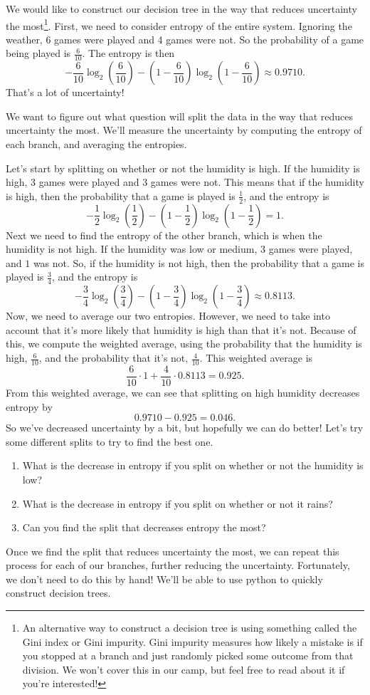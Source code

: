 \documentclass[10pt]{article}
\begin{document}
We would like to construct our decision tree in the way that reduces uncertainty the most\footnote{An alternative way to construct a decision tree is using something called the Gini index or Gini impurity. Gini impurity measures how likely a mistake is if you stopped at a branch and just randomly picked some outcome from that division. We won't cover this in our camp, but feel free to read about it if you're interested!}. First, we need to consider entropy of the entire system. Ignoring the weather, 6 games were played and 4 games were not. So the probability of a game being played is $\frac{6}{10}$. The entropy is then
\[
-\frac{6}{10}\log_2\left(\frac{6}{10}\right) - \left(1-\frac{6}{10}\right)\log_2\left(1-\frac{6}{10}\right)\approx 0.9710.
\]
That's a lot of uncertainty!

We want to figure out what question will split the data in the way that reduces uncertainty the most. We'll measure the uncertainty by computing the entropy of each branch, and averaging the entropies.

Let's start by splitting on whether or not the humidity is high. If the humidity is high, 3 games were played and 3 games were not. This means that if the humidity is high, then the probability that a game is played is $\frac{1}{2}$, and the entropy is
\[
-\frac{1}{2}\log_2\left(\frac{1}{2}\right) - \left(1-\frac{1}{2}\right)\log_2\left(1-\frac{1}{2}\right)=1.
\]
Next we need to find the entropy of the other branch, which is when the humidity is not high. If the humidity was low or medium, $3$ games were played, and $1$ was not. So, if the humidity is not high, then the probability that a game is played is $\frac{3}{4}$, and the entropy is
\[
-\frac{3}{4}\log_2\left(\frac{3}{4}\right) - \left(1-\frac{3}{4}\right)\log_2\left(1-\frac{3}{4}\right)\approx 0.8113.
\]
Now, we need to average our two entropies. However, we need to take into account that it's more likely that humidity is high than that it's not. Because of this, we compute the weighted average, using the probability that the humidity is high, $\frac{6}{10}$, and the probability that it's not, $\frac{4}{10}$. This weighted average is
\[
\frac{6}{10}\cdot 1 + \frac{4}{10}\cdot 0.8113 = 0.925.
\]
From this weighted average, we can see that splitting on high humidity decreases entropy by
\[
0.9710 - 0.925 = 0.046.
\]
So we've decreased uncertainty by a bit, but hopefully we can do better! Let's try some different splits to try to find the best one.

\begin{enumerate}
\item What is the decrease in entropy if you split on whether or not the humidity is low?
\vfill

\newpage
\item What is the decrease in entropy if you split on whether or not it rains?
\vfill

\item Can you find the split that decreases entropy the most?
\vfill
\end{enumerate}

Once we find the split that reduces uncertainty the most, we can repeat this process for each of our branches, further reducing the uncertainty. Fortunately, we don't need to do this by hand! We'll be able to use python to quickly construct decision trees.
\end{document}

